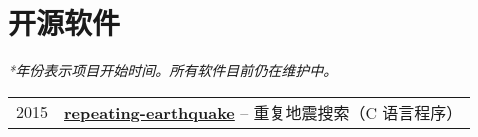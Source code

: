 \section*{开源软件}

\textit{*年份表示项目开始时间。所有软件目前仍在维护中。}

\begin{tabular}{p{} p{}}
2015 &	\textbf{\href{https://github.com/core-man/repeating-earthquake/}{repeating-earthquake}} -- 重复地震搜索（C 语言程序） \\
\end{tabular}
